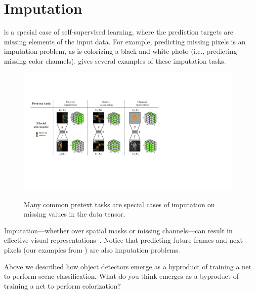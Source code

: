 \section{Imputation}
 is a special case of self-supervised learning, where the prediction targets are missing elements of the input data. For example, predicting missing pixels is an imputation problem, as is colorizing a black and white photo (i.e., predicting missing color channels). \Fig{\ref{fig:representation_learning:imputation_examples}} gives several examples of these imputation tasks.
\begin{figure}[h!]
    \centerline{
        \includegraphics[width=1.0\linewidth]{figures/representation_learning/imputation_examples.pdf}
        \label{fig:representation_learning:imputation_examples}
    }
    \caption{Many common pretext tasks are special cases of imputation on missing values in the data tensor.}
    \label{fig:representation_learning:imputation_examples}
  \vspace{-1.0em}
\end{figure}

Imputation—whether over spatial masks or missing channels—can result in effective visual representations~\cite{vincent2008extracting, pathak2016context,he2022masked,zhang2016colorful,larsson2016learning,zhang2017split}. Notice that predicting future frames and next pixels (our examples from \fig{\ref{fig:representation_learning:predictive_learning_examples}}) are also imputation problems.

Above we described how object detectors emerge as a byproduct of training a net to perform scene classification. What do you think emerges as a byproduct of training a net to perform colorization?

